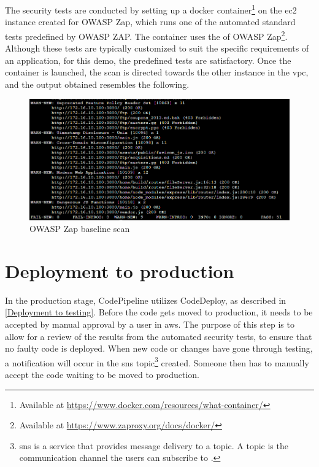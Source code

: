 The security tests are conducted by setting up a docker container\footnote{Available at \url{https://www.docker.com/resources/what-container/}} on the \acrshort{ec2} instance created for OWASP Zap, which runs one of the automated standard tests predefined by OWASP ZAP. The container uses the  of OWASP Zap\footnote{Available at \url{https://www.zaproxy.org/docs/docker/}}. Although these tests are typically customized to suit the specific requirements of an application, for this demo, the predefined tests are satisfactory. Once the container is launched, the scan is directed towards the other instance in the \acrshort{vpc}, and the output obtained resembles the following.

\vspace{2mm}
\begin{figure}[H]
    \centering
    \includegraphics[width=0.8\columnwidth]{Images/owasp-zap-scan.png}
    \caption{OWASP Zap baseline scan}
    \label{fig: OWASP Zap baseline scan}
\end{figure}


\section{Deployment to production}
In the production stage, CodePipeline utilizes CodeDeploy, as described in \ref{Deployment to testing}. Before the code gets moved to production, it needs to be accepted by manual approval by a user in \acrshort{aws}. The purpose of this step is to allow for a review of the results from the automated security tests, to
ensure that no faulty code is deployed. When new code or changes have gone through testing, a notification will occur in the \acrshort{sns} topic\footnote{\acrshort{sns} is a service that provides message delivery to a topic. A topic is the communication channel the users can subscribe to \cite{SNStopic}.} created. Someone then has to manually accept the code waiting to be moved to production.

